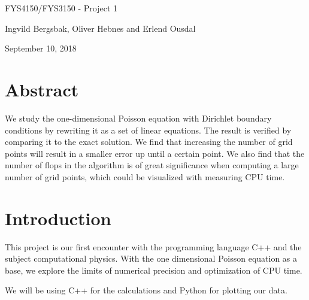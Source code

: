 \documentclass[%
oneside,                 %
final,                   %
10pt]{article}
\begin{document}
\newcommand{\exercisesection}[1]{\subsection*{#1}}


\thispagestyle{empty}

\begin{center}
{\LARGE\bf
\begin{spacing}{1.25}
FYS4150/FYS3150 - Project 1
\end{spacing}
}
\end{center}



\begin{center}
\centerline{{\small Ingvild Bergsbak, Oliver Hebnes and Erlend Ousdal}}
\end{center}



\begin{center}
September 10, 2018
\end{center}

\vspace{1cm}

\newpage{}


\section{Abstract}

We study the one-dimensional Poisson equation with Dirichlet boundary conditions by rewriting it as a set of linear equations.
The result is verified by comparing it to the exact solution. We find that increasing the number of grid points
will result in a smaller error up until a certain point. We also find that the number of flops in the algorithm is of great significance when computing a large number of grid points, which could be visualized with measuring CPU time. 

\section{Introduction}

This project is our first encounter with the programming language C++ and the subject computational physics. With the one dimensional Poisson equation as a base, we explore the limits of numerical precision and optimization of CPU time. 

We will be using C++ for the calculations and Python for plotting our data.
\end{document}
